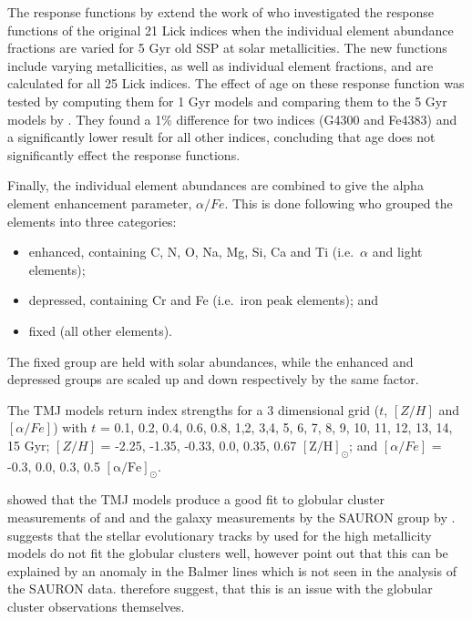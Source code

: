 			The response functions by \citet{Korn2005} extend the work of \citet{Tripicco1995} who investigated the response functions of the original 21 Lick indices when the individual element abundance fractions are varied for 5 Gyr old SSP at solar metallicities. The new functions include varying metallicities, as well as individual element fractions, and are calculated for all 25 Lick indices. The effect of age on these response function was tested by computing them for 1 Gyr models and comparing them to the 5 Gyr models by \citet{Tripicco1995}. They found a 1\% difference for two indices (G4300 and Fe4383) and a significantly lower result for all other indices, concluding that age does not significantly effect the response functions.

			Finally, the individual element abundances are combined to give the alpha element enhancement parameter, $\alpha/Fe$. This is done following \citet{Trager2000} who grouped the elements into three categories: 
			\begin{itemize}
				\item enhanced, containing C, N, O, Na, Mg, Si, Ca and Ti (i.e.\ $\alpha$ and light elements); 
				\item depressed, containing Cr and Fe (i.e.\ iron peak elements); and
				\item fixed (all other elements). 
			\end{itemize}
			The fixed group are held with solar abundances, while the enhanced and depressed groups are scaled up and down respectively by the same factor. 

			The TMJ models return index strengths for a 3 dimensional grid ($t$, $[Z/H]$ and $[\alpha/Fe]$) with $t$ = 0.1, 0.2, 0.4, 0.6, 0.8, 1,2, 3,4, 5, 6, 7, 8, 9, 10, 11, 12, 13, 14, 15 Gyr; $[Z/H]$ = -2.25, -1.35, -0.33, 0.0, 0.35, 0.67 $\mathrm{[Z/H]_\odot}$; and $[\alpha/Fe]$ = -0.3, 0.0, 0.3, 0.5 $\mathrm{[\alpha/Fe]_\odot}$.

			\citet{Thomas2010} showed that the TMJ models produce a good fit to globular cluster measurements of \citet{Puzia2002} and \citet{Schiavon2005} and the galaxy measurements by the SAURON group by \citet{Kuntschner2010}. \citet{Conroy2010} suggests that the stellar evolutionary tracks by \citet{Girardi2000} used for the high metallicity models do not fit the globular clusters well, however \citet{Thomas2010} point out that this can be explained by an anomaly in the Balmer lines which is not seen in the analysis of the SAURON data. \citet{Thomas2010} therefore suggest, that this is an issue with the globular cluster observations themselves. 

